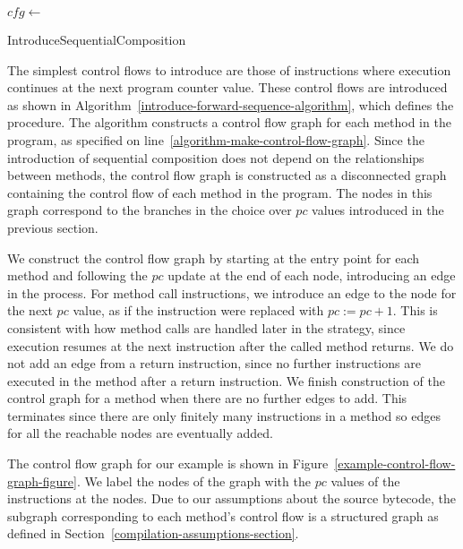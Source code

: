 \begin{algorithm}
  \begin{algorithmic}[1]
    \State $cfg \gets$ 
    \label{algorithm-make-control-flow-graph}
    \label{algorithm-sequence-cfg-loop}
    \label{algorithm-forward-sequence-condition}
    \State {}
    \label{algorithm-forward-sequence-application}
    \EndWhile
    \EndFor
  \end{algorithmic}
  \caption{IntroduceSequentialComposition}
  \label{introduce-forward-sequence-algorithm}
\end{algorithm}
The simplest control flows to introduce are those of instructions
where execution continues at the next program counter value.
These control flows are introduced as shown in
Algorithm~\ref{introduce-forward-sequence-algorithm}, which defines
the  procedure.
The algorithm constructs a control flow graph for each method in the
program, as specified on line~\ref{algorithm-make-control-flow-graph}.
Since the introduction of sequential composition does not depend on
the relationships between methods, the control flow graph is
constructed as a disconnected graph containing the control flow of
each method in the program.
The nodes in this graph correspond to the branches in the choice over
$pc$ values introduced in the previous section.

We construct the control flow graph by starting at the entry point for
each method and following the $pc$ update at the end of each node,
introducing an edge in the process.
For method call instructions, we introduce an edge to the node for the
next $pc$ value, as if the instruction were replaced with
$pc := pc + 1$.
This is consistent with how method calls are handled later in the
strategy, since execution resumes at the next instruction after the
called method returns.
We do not add an edge from a return instruction, since no further
instructions are executed in the method after a return instruction.
We finish construction of the control graph for a method when there
are no further edges to add.
This terminates since there are only finitely many instructions in a
method so edges for all the reachable nodes are eventually added.

The control flow graph for our example is shown in
Figure~\ref{example-control-flow-graph-figure}.
We label the nodes of the graph with the $pc$ values of the
instructions at the nodes.
Due to our assumptions about the source bytecode, the subgraph
corresponding to each method's control flow is a structured graph as
defined in Section~\ref{compilation-assumptions-section}.

